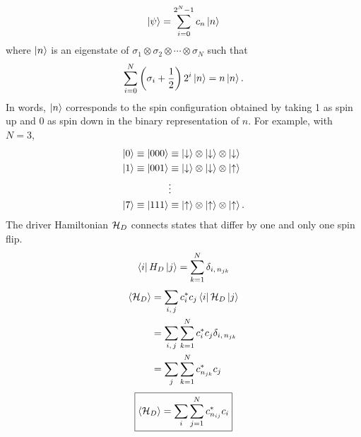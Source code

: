 \begin{equation}
  \left| \psi \right> = \sum_{i=0}^{2^N-1} c_n \left| n \right>
  \label{}
\end{equation}
where $\left| n \right>$ is an eigenstate of
$\sigma_1 \otimes \sigma_2 \otimes \cdots \otimes \sigma_N$
such that
\begin{equation}
    \sum_{i=0}^N \left( \sigma_i + \frac{1}{2} \right) 2^i \left| n \right> = n \left| n \right>.
  \label{}
\end{equation}
In words, $\left| n \right>$ corresponds to the spin configuration obtained by taking 1
as spin up and 0 as spin down in the binary representation of $n$.
For example, with $N=3$,
\begin{align*}
  \left| 0 \right> \equiv \left| 000 \right>
  &\equiv
  \left| \downarrow \right> \otimes
  \left| \downarrow \right> \otimes
  \left| \downarrow \right> \\
  \left| 1 \right> \equiv \left| 001 \right>
  &\equiv
  \left| \downarrow \right> \otimes
  \left| \downarrow \right> \otimes
  \left| \uparrow \right> \\
  &\vdots \\
  \left| 7 \right> \equiv \left| 111 \right>
  &\equiv
  \left| \uparrow \right> \otimes
  \left| \uparrow \right> \otimes
  \left| \uparrow \right>.
  \label{}
\end{align*}
The driver Hamiltonian $\mathcal{H}_D$ connects states that differ by one and only one
spin flip.
\begin{equation}
  \matrixel{i}{H_D}{j} = \sum_{k=1}^N \delta_{i,\, n_{jk}}
  \label{}
\end{equation}
\begin{align}
  \avg{\ham_D}
  &= \sum_{i,\,j} c_i^* c_j \matrixel{i}{\ham_D}{j} \\
  &= \sum_{i,\,j} \sum_{k=1}^N c_i^* c_j \delta_{i,\, n_{jk}} \\
  &= \sum_j \sum_{k=1}^N c_{n_{jk}}^* c_j
  \label{}
\end{align}
\begin{equation}
  \boxed{
  \left< \mathcal{H}_D \right> = \sum_i \sum_{j=1}^N c_{n_{ij}}^* c_i
  }
  \label{}
\end{equation}


